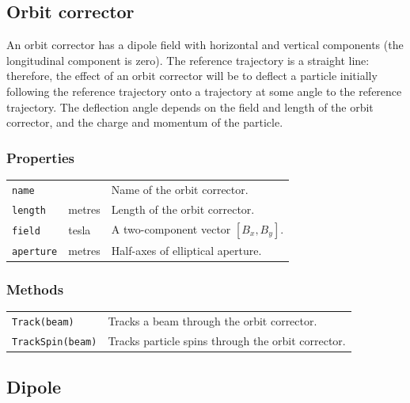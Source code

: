 \documentclass[11pt,twoside,a4paper]{article}
\begin{document}

\subsection{Orbit corrector}

An orbit corrector has a dipole field with horizontal and vertical components
(the longitudinal component is zero).  The reference trajectory is a straight line:
therefore, the effect of an orbit corrector will be to deflect a particle initially following
the reference trajectory onto a trajectory at some angle to the reference trajectory.
The deflection angle depends on the field and length of the orbit corrector, and the
charge and momentum of the particle.

\subsubsection{Properties}

\begin{tabular}{|l|l|l|}
\hline
\texttt{name} &   & Name of the orbit corrector. \\
\texttt{length} & metres       & Length of the orbit corrector. \\
\texttt{field}  & tesla        & A two-component vector $[B_x, B_y]$. \\
\texttt{aperture} & metres & Half-axes of elliptical aperture. \\
\hline
\end{tabular}
\vspace{0.2in}

\subsubsection{Methods}

\begin{tabular}{|l|l|}
\hline
\texttt{Track(beam)}     & Tracks a beam through the orbit corrector. \\
\texttt{TrackSpin(beam)} & Tracks particle spins through the orbit corrector. \\
\hline
\end{tabular}
\vspace{0.2in}


\subsection{Dipole}
\end{document}
